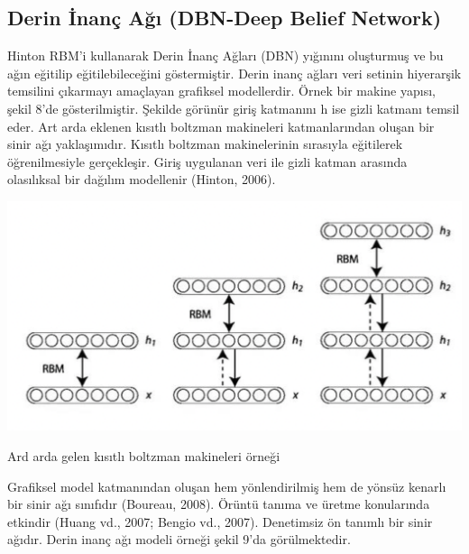 \documentclass{article}
\begin{document}
\newpage
\begin{multicols}{2}
\subsection{Derin İnanç Ağı (DBN-Deep
Belief Network)}

Hinton RBM’i kullanarak Derin İnanç Ağları
(DBN) yığınını oluşturmuş ve bu ağın eğitilip
eğitilebileceğini göstermiştir. Derin inanç ağları
veri setinin hiyerarşik temsilini çıkarmayı
amaçlayan grafiksel modellerdir. Örnek bir
makine yapısı, şekil 8’de gösterilmiştir. Şekilde
görünür giriş katmanını h ise gizli katmanı temsil
eder. Art arda eklenen kısıtlı boltzman
makineleri katmanlarından oluşan bir sinir ağı
yaklaşımıdır. Kısıtlı boltzman makinelerinin
sırasıyla eğitilerek öğrenilmesiyle gerçekleşir.
Giriş uygulanan veri ile gizli katman arasında
olasılıksal bir dağılım modellenir (Hinton, 2006).

\begin{minipage}{\linewidth}
    \includegraphics[width=0.8\linewidth]{kisitlibol.png} 
    \label{fig:Şekil 8}
\end{minipage}
\begin{center}
    Ard arda gelen kısıtlı boltzman
makineleri örneği \cite{ref4}
\end{center}

\vspace{5pt}
Grafiksel model katmanından oluşan hem
yönlendirilmiş hem de yönsüz kenarlı bir sinir
ağı sınıfıdır (Boureau, 2008). Örüntü tanıma ve
üretme konularında etkindir (Huang vd., 2007;
Bengio vd., 2007). Denetimsiz ön tanımlı bir
sinir ağıdır. Derin inanç ağı modeli örneği şekil
9’da görülmektedir.
\vspace{10pt}


\end{multicols}
\end{document}
